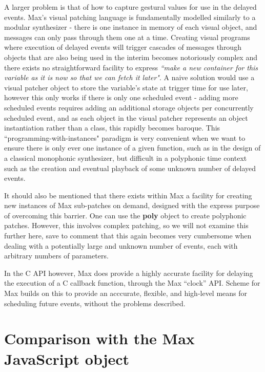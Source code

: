 \documentclass[acmsmall]{acmart}
\begin{document}
A larger problem is that of how to capture gestural values for use in the delayed
events. Max's visual patching language is fundamentally modelled similarly to a modular
synthesizer - there is one instance in memory of each visual object, and messages can only
pass through them one at a time. Creating visual programs where execution of 
delayed events will trigger cascades of messages through objects that are also 
being used in the interim becomes notoriously complex and there exists no straightforward
facility to express \textit{``make a new container for this variable as it is now so that
we can fetch it later"}. A naive solution would use a visual patcher object to store 
the variable's state at trigger time for use later, however this only works
if there is only one scheduled event - adding more scheduled events requires adding
an additional storage objects per concurrently scheduled event, and as each object in the visual patcher
represents an object instantiation rather than a class, this rapidly becomes
baroque. This ``programming-with-instances" paradigm
is very convenient when we want to ensure there is only ever one instance of a given function, such
as in the design of a classical monophonic synthesizer, but difficult in a polyphonic time context
such as the creation and eventual playback of some unknown number of delayed events.


It should also be mentioned that there exists within Max a facility for creating
new instances of Max sub-patches on demand, designed with the express purpose of
overcoming this barrier. One can use the \textbf{poly} object to create polyphonic
patches. However, this involves complex patching, so we will not examine this further here,
save to comment that this again becomes very cumbersome when dealing
with a potentially large and unknown number of events, each with arbitrary numbers
of parameters.

In the C API however, Max does provide a highly accurate facility for delaying
the execution of a C callback function, through the Max ``clock'' API. Scheme
for Max builds on this to provide an acccurate, flexible, and high-level means 
for scheduling future events, without the problems described.

\section{Comparison with the Max JavaScript object}
\end{document}
